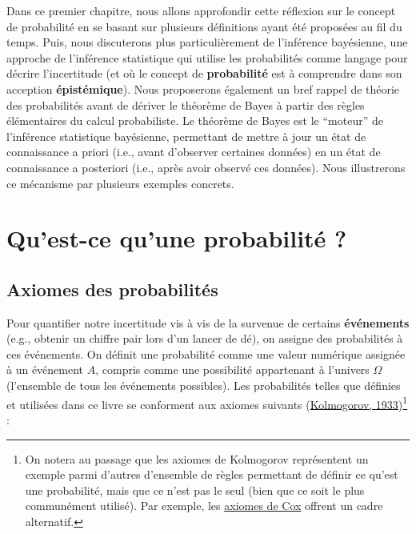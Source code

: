 \documentclass[
  a4paper,11pt,twoside,onecolumn,openright,final,oldfontcommands]{memoir}
\theoremstyle{definition}
\theoremstyle{definition}
\theoremstyle{definition}
\theoremstyle{definition}
\theoremstyle{remark}
\begin{document}
Dans ce premier chapitre, nous allons approfondir cette réflexion sur le concept de probabilité en se basant sur plusieurs définitions ayant été proposées au fil du temps. Puis, nous discuterons plus particulièrement de l'inférence bayésienne, une approche de l'inférence statistique qui utilise les probabilités comme langage pour décrire l'incertitude (et où le concept de \textbf{probabilité} est à comprendre dans son acception \textbf{épistémique}). Nous proposerons également un bref rappel de théorie des probabilités avant de dériver le théorème de Bayes à partir des règles élémentaires du calcul probabiliste. Le théorème de Bayes est le ``moteur'' de l'inférence statistique bayésienne, permettant de mettre à jour un état de connaissance a priori (i.e., avant d'observer certaines données) en un état de connaissance a posteriori (i.e., après avoir observé ces données). Nous illustrerons ce mécanisme par plusieurs exemples concrets.

\hypertarget{quest-ce-quune-probabilituxe9}{%
\section{Qu'est-ce qu'une probabilité ?}\label{quest-ce-quune-probabilituxe9}}

\hypertarget{axiomes-des-probabilituxe9s}{%
\subsection{Axiomes des probabilités}\label{axiomes-des-probabilituxe9s}}

Pour quantifier notre incertitude vis à vis de la survenue de certains \textbf{événements} (e.g., obtenir un chiffre pair lors d'un lancer de dé), on assigne des probabilités à ces événements. On définit une probabilité comme une valeur numérique assignée à un événement \(A\), compris comme une possibilité appartenant à l'univers \(\Omega\) (l'ensemble de tous les événements possibles). Les probabilités telles que définies et utilisées dans ce livre se conforment aux axiomes suivants (\protect\hyperlink{ref-kolmogorov_foundations_1933}{Kolmogorov, 1933})\footnote{On notera au passage que les axiomes de Kolmogorov représentent un exemple parmi d'autres d'ensemble de règles permettant de définir ce qu'est une probabilité, mais que ce n'est pas le seul (bien que ce soit le plus communément utilisé). Par exemple, les \href{https://en.wikipedia.org/wiki/Cox\%27s_theorem}{axiomes de Cox} offrent un cadre alternatif.} :
\end{document}
